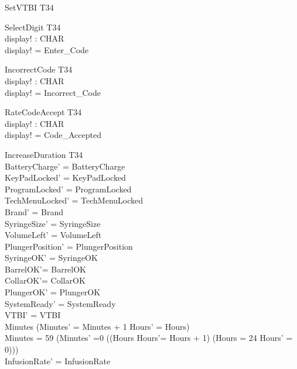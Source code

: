 \documentclass[landscape]{article}
\begin{document}
\begin{schema} {SetVTBI}
\Xi T34
\end{schema}

\begin{schema} {SelectDigit}
\Xi T34\\
display! : CHAR\\
\where
display! = Enter\_Code\\
\end{schema}

\begin{schema} {IncorrectCode}
\Xi T34\\
display! : CHAR\\
\where
display! = Incorrect\_Code\\
\end{schema}

\begin{schema} {RateCodeAccept}
\Xi T34\\
display! : CHAR\\
\where
display! = Code\_Accepted\\
\end{schema}

\begin{schema} {IncreaseDuration}
\Delta T34\\
\where
BatteryCharge' =  BatteryCharge \\
KeyPadLocked' = KeyPadLocked\\
ProgramLocked' = ProgramLocked \\
TechMenuLocked' = TechMenuLocked\\
Brand' = Brand\\ 
SyringeSize' = SyringeSize\\
VolumeLeft' = VolumeLeft\\
PlungerPosition' = PlungerPosition \\
SyringeOK' = SyringeOK\\
BarrelOK'= BarrelOK\\
CollarOK'= CollarOK\\
PlungerOK' = PlungerOK \\
SystemReady' = SystemReady\\
VTBI' = VTBI \\ 
Minutes  \implies (Minutes' = Minutes + 1 \land Hours' = Hours)\\
Minutes = 59 \implies (Minutes' =0 \land ((Hours  \implies Hours'= Hours + 1) \land (Hours = 24 \implies Hours' = 0)))\\
InfusionRate' = InfusionRate\\
\end{schema}
\end{document}
